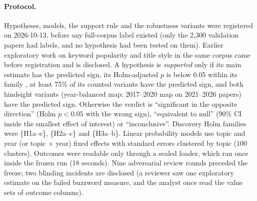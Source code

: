 \paragraph{Protocol.} Hypotheses, models, the support rule and the robustness variants were registered on 2026-10-13,
before any full-corpus label existed (only the 2,300 validation papers had labels, and no hypothesis had been tested
on them). Earlier exploratory work on keyword popularity and title style in the same corpus came before registration
and is disclosed. A hypothesis is \emph{supported} only if its main estimate has the predicted sign, its Holm-adjusted
$p$ is below 0.05 within its family \citep{holm1979simple}, at least 75\% of its counted variants have the predicted
sign, and both hindsight variants (year-balanced map; 2017--2020 map on 2021--2026 papers) have the predicted sign.
Otherwise the verdict is ``significant in the opposite direction'' (Holm $p<0.05$ with the wrong sign), ``equivalent
to null'' (90\% CI inside the smallest effect of interest) or ``inconclusive''. Discovery Holm families were
\{H1a--e\}, \{H2a--c\} and \{H3a--b\}. Linear probability models use topic and year (or topic $\times$ year) fixed
effects with standard errors clustered by topic (100 clusters). Outcomes were readable only through a sealed loader,
which ran once inside the frozen run (18 seconds). Nine adversarial review rounds preceded the freeze; two blinding
incidents are disclosed (a reviewer saw one exploratory estimate on the failed buzzword measure, and the analyst once
read the value sets of outcome columns).

